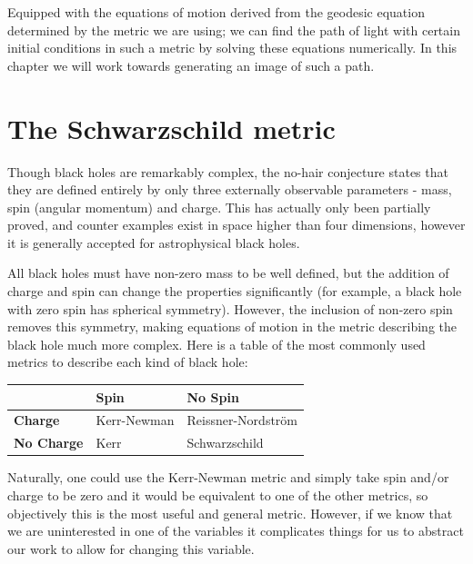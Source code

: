 \documentclass[oneside,openright,frontopenright, singlespacing]{dmathesis}
\begin{document}
	Equipped with the equations of motion derived from the geodesic equation determined by the metric we are using; we can find the path of light with certain initial conditions in such a metric by solving these equations numerically. In this chapter we will work towards generating an image of such a path.

\section{The Schwarzschild metric}\label{sec:Section3.1}

	Though black holes are remarkably complex, the no-hair conjecture states that they are defined entirely by only three externally observable parameters - mass, spin (angular momentum) and charge. This has actually only been partially proved, and counter examples exist in space higher than four dimensions, however it is generally accepted for astrophysical black holes.

	All black holes must have non-zero mass to be well defined, but the addition of charge and spin can change the properties significantly (for example, a black hole with zero spin has spherical symmetry). However, the inclusion of non-zero spin removes this symmetry, making equations of motion in the metric describing the black hole much more complex. Here is a table of the most commonly used metrics to describe each kind of black hole:

\vspace{1em}
\begin{center}
	\begin{tabular}{l l l}
		\toprule
		\textbf{ } & \textbf{Spin} & \textbf{No Spin}\\
		\midrule
		\textbf{Charge} & Kerr-Newman & Reissner-Nordström \\
		\midrule
		\textbf{No Charge} & Kerr & Schwarzschild \\
		\bottomrule
	\end{tabular}
\end{center}

\vspace{1em}
	Naturally, one could use the Kerr-Newman metric and simply take spin and/or charge to be zero and it would be equivalent to one of the other metrics, so objectively this is the most useful and general metric. However, if we know that we are uninterested in one of the variables it complicates things for us to abstract our work to allow for changing this variable.
\end{document}
